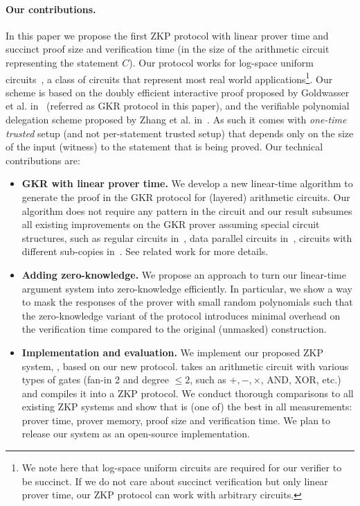 \paragraph{Our contributions.} In this paper we propose the first ZKP protocol with linear prover time and succinct proof size and verification time (in the size of the arithmetic circuit representing the statement $C$). Our protocol works  for log-space uniform circuits~\cite{GKR}, a class of circuits that represent most real world applications\footnote{We note here that log-space uniform circuits are required for our verifier to be succinct. If we do not care about succinct verification but only linear prover time, our ZKP protocol can work with arbitrary circuits. }. Our scheme is based on the doubly efficient interactive proof proposed by Goldwasser et al. in~\cite{GKR} (referred as GKR protocol in this paper), and the verifiable polynomial delegation scheme proposed by Zhang et al. in~\cite{zhang2017vsql}. As such it comes with \emph{one-time trusted} setup (and not per-statement trusted setup) that depends only on the size of the input (witness) to the statement that is being proved. Our technical  contributions are:
\begin{itemize}
	\item \textbf{GKR with linear prover time.} We develop a new linear-time algorithm to generate the proof in the GKR protocol for (layered) arithmetic circuits. Our algorithm does not require any pattern in the circuit and our result subsumes all existing improvements on the GKR prover assuming special circuit structures, such as regular circuits in~\cite{t13}, data parallel circuits in~\cite{t13,wahby2017full}, circuits with different sub-copies in~\cite{vram}. See related work for more details. 
	\item \textbf{Adding zero-knowledge.} We propose an approach to turn our linear-time argument system into zero-knowledge efficiently. In particular, we show a way to mask the responses of the prover with small random polynomials such that the zero-knowledge variant of the protocol introduces minimal overhead on the verification time compared to the original (unmasked) construction. 
	\item \textbf{Implementation and evaluation.}  We implement our proposed ZKP system, \name, based on our new protocol. \name takes an arithmetic circuit with various types of gates (fan-in 2 and degree $\le 2$, such as $+,-,\times$, AND, XOR, etc.) and compiles it into a ZKP protocol. We conduct thorough comparisons to all existing ZKP systems and show that \name is (one of) the best in all measurements: prover time, prover memory, proof size and verification time. We plan to release our system as an open-source implementation.

\end{itemize}

